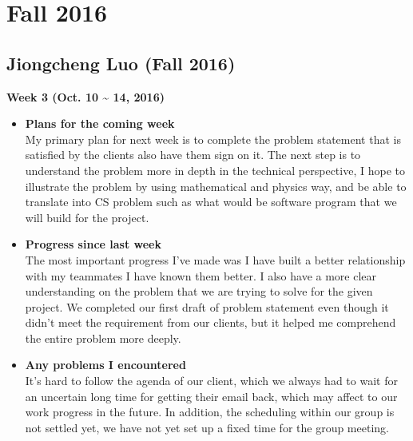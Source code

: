 \newpage
	\section{Fall 2016}
		\subsection{Jiongcheng Luo (Fall 2016)}
		\vspace{0.5cm}

		\begin{center}
			\textbf{Week 3 (Oct. 10 {\textasciitilde{}} 14, 2016)}
		\end{center}
		\begin{itemize}
			\item \textbf{Plans for the coming week}
			\\My primary plan for next week is to complete the problem statement that is satisfied by the clients also have them sign on it. The next step is to understand the problem more in depth in the technical perspective, I hope to illustrate the problem by using mathematical and physics way, and be able to translate into CS problem such as what would be software program that we will build for the project.\\

			\item \textbf{Progress since last week}
			\\The most important progress I've made was I have built a better relationship with my teammates I have known them better. I also have a more clear understanding on the problem that we are trying to solve for the given project. We completed our first draft of problem statement even though it didn't meet the requirement from our clients, but it helped me comprehend the entire problem more deeply.\\

			\item \textbf{Any problems I encountered}
			\\It's hard to follow the agenda of our client, which we always had to wait for an uncertain long time for getting their email back, which may affect to our work progress in the future. In addition, the scheduling within our group is not settled yet, we have not yet set up a fixed time for the group meeting.\\
		\end{itemize}

